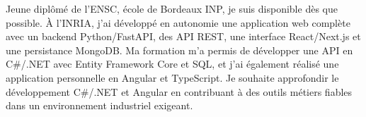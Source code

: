 
\begin{cvparagraph}
Jeune diplômé de l’ENSC, école de Bordeaux INP, je suis disponible dès que possible. À l’INRIA, j’ai développé en autonomie une application web complète avec un backend Python/FastAPI, des API REST, une interface React/Next.js et une persistance MongoDB. Ma formation m’a permis de développer une API en C\#/.NET avec Entity Framework Core et SQL, et j’ai également réalisé une application personnelle en Angular et TypeScript. Je souhaite approfondir le développement C\#/.NET et Angular en contribuant à des outils métiers fiables dans un environnement industriel exigeant.
\end{cvparagraph}
